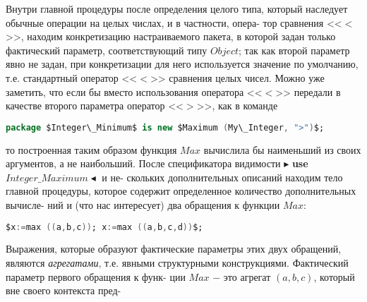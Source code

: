 Внутри главной процедуры после определения  целого типа, который\linebreak
наследует обычные операции на целых числах, и в частности, опера-\linebreak
тор сравнения <<$<$>>, находим конкретизацию настраиваемого пакета, в\linebreak
которой задан только фактический параметр, соответствующий типу\linebreak
$Object$; так как второй параметр явно не задан, при конкретизации для\linebreak
него используется значение по умолчанию, т.е. стандартный оператор\linebreak
<<$<$>> сравнения целых чисел. Можно уже заметить, что если бы вместо\linebreak
использования оператора <<$<$>> передали  в качестве второго параметра\linebreak
оператор <<$>$>>, как в команде
\begin{lstlisting}[mathescape=true, frame=none, language=Ada, xleftmargin=15pt]
package $Integer\_Minimum$ is new $Maximum (My\_Integer, ">")$;
\end{lstlisting}
то построенная таким образом функция $Max$ вычислила бы наименьший\linebreak
из своих аргументов, а не наибольший.\newline
\hspace*{15pt}После спецификатора видимости $\blacktriangleright$ \textbf{use} $Integer\_Maximum \blacktriangleleft$ и не-\linebreak
скольких дополнительных описаний находим тело главной процедуры,\linebreak
которое содержит определенное количество дополнительных вычисле-\linebreak
ний и (что нас интересует) два обращения к функции $Max$:
\begin{lstlisting}[mathescape=true, language=Ada, frame=none, xleftmargin=15pt]
$x:=max ((a,b,c)); x:=max ((a,b,c,d))$;
\end{lstlisting}
Выражения,  которые  образуют  фактические  параметры  этих  двух\linebreak
обращений,  являются \textit{агрегатами}, т.е.  явными  структурными\linebreak
конструкциями.  Фактический  параметр первого обращения  к функ-\linebreak
ции $Max$ $-$ это агрегат $(a,b,c)$, который вне своего контекста пред­-\linebreak
